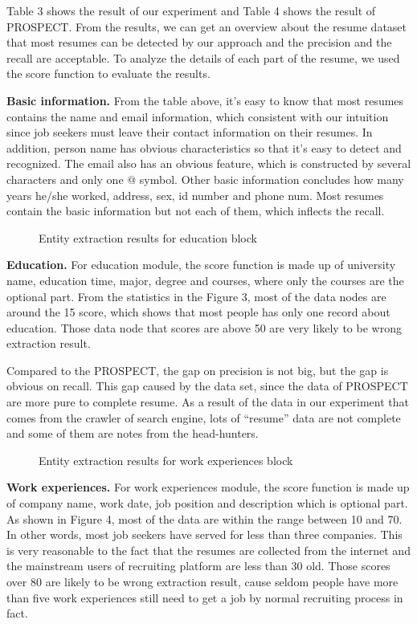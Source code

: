 \documentclass{acm_proc_article-sp}
\begin{document}
Table 3 shows the result of our experiment and Table 4 shows the result of PROSPECT.
From the results, we can get an overview about the resume dataset that most resumes can be detected by our approach and the precision and the recall are acceptable.
To analyze the details of each part of the resume, we used the score function to evaluate the results.

\textbf{Basic information.}
From the table above, it's easy to know that most resumes contains the name and email information, which consistent with our intuition since job seekers must leave their contact information on their resumes.
In addition, person name has obvious characteristics so that it's easy to detect and recognized.
The email also has an obvious feature, which is constructed by several characters and only one $@$ symbol.
Other basic information concludes how many years he/she worked, address, sex, id number and phone num.
Most resumes contain the basic information but not each of them, which inflects the recall.


\begin{figure}\label{edu-scores}
\centering
{}
\caption{Entity extraction results for education block}
\end{figure}

\textbf{Education.} 
For education module, the score function is made up of university name, education time, major, degree and courses, where only the courses are the optional part.
From the statistics in the Figure 3, most of the data nodes are around the 15 score, which shows that most people has only one record about education. 
Those data node that scores are above 50 are very likely to be wrong extraction result.

Compared to the PROSPECT, the gap on precision is not big, but the gap is obvious on recall.
This gap caused by the data set, since the data of PROSPECT are more pure to complete resume. 
As a result of the data in our experiment that comes from the crawler of search engine, lots of ``resume'' data are not complete and some of them are notes from the head-hunters.

\begin{figure}\label{wk-scores}
\centering
{}
\caption{Entity extraction results for work experiences block}
\end{figure}

\textbf{Work experiences.}
For work experiences module, the score function is made up of company name, work date, job position and description which is optional part.
As shown in Figure 4, most of the data  are within the range between 10 and 70.
In other words, most job seekers have served for less than three companies.
This is very reasonable to the fact that the resumes are collected from the internet and the mainstream users of recruiting platform are less than 30 old.
Those scores over 80 are likely to be wrong extraction result, cause seldom people have more than five work experiences still need to get a job by normal recruiting process in fact.
\end{document}

